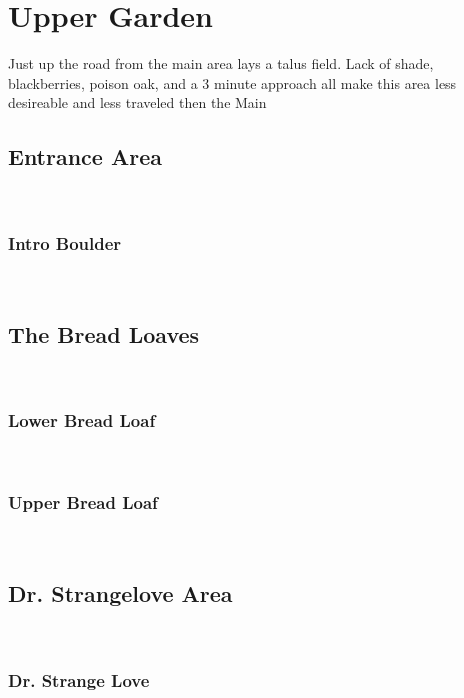 \chapter{Upper Garden}\label{a:Upper Garden}
\lhead{\textcolor{\chapterColor}{\rule[-2pt]{\textwidth}{15pt}}}
Just up the road from the main area lays a talus field. Lack of shade, blackberries, poison oak, and a 3 minute approach all make this area less desireable and less traveled then the Main

\section{Entrance Area}\label{sa:Entrance Area}
\

\subsection*{Intro Boulder}\label{bf:Intro Boulder}
\

\section{The Bread Loaves}\label{sa:The Bread Loaves}
\

\subsection*{Lower Bread Loaf}\label{bf:Lower Bread Loaf}
\

\subsection*{Upper Bread Loaf}\label{bf:Upper Bread Loaf}
\

\section{Dr. Strangelove Area}\label{sa:Dr. Strangelove Area}
\

\subsection*{Dr. Strange Love}\label{bf:Dr. Strange Love}
\

\clearpage